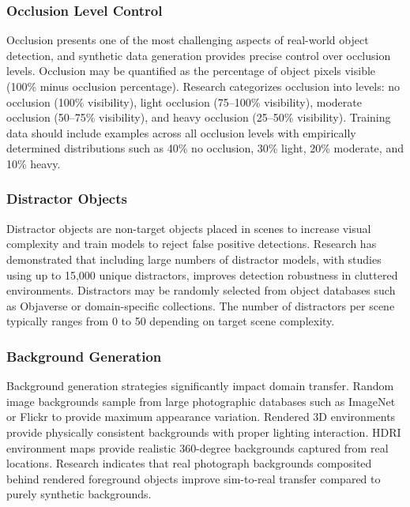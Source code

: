 \subsubsection{Occlusion Level Control}

Occlusion presents one of the most challenging aspects of real-world object detection, and synthetic data generation provides precise control over occlusion levels. Occlusion may be quantified as the percentage of object pixels visible (100\% minus occlusion percentage). Research categorizes occlusion into levels: no occlusion (100\% visibility), light occlusion (75--100\% visibility), moderate occlusion (50--75\% visibility), and heavy occlusion (25--50\% visibility). Training data should include examples across all occlusion levels with empirically determined distributions such as 40\% no occlusion, 30\% light, 20\% moderate, and 10\% heavy.

\subsubsection{Distractor Objects}

Distractor objects are non-target objects placed in scenes to increase visual complexity and train models to reject false positive detections. Research has demonstrated that including large numbers of distractor models, with studies using up to 15,000 unique distractors, improves detection robustness in cluttered environments. Distractors may be randomly selected from object databases such as Objaverse or domain-specific collections. The number of distractors per scene typically ranges from 0 to 50 depending on target scene complexity.

\subsubsection{Background Generation}

Background generation strategies significantly impact domain transfer. Random image backgrounds sample from large photographic databases such as ImageNet or Flickr to provide maximum appearance variation. Rendered 3D environments provide physically consistent backgrounds with proper lighting interaction. HDRI environment maps provide realistic 360-degree backgrounds captured from real locations. Research indicates that real photograph backgrounds composited behind rendered foreground objects improve sim-to-real transfer compared to purely synthetic backgrounds.

